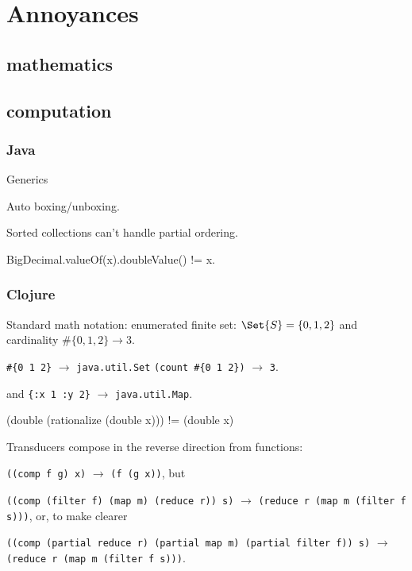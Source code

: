 \chapter{Annoyances}

\section{mathematics}

\section{computation}

\subsection{Java}
\lstset{language=Java}

Generics

Auto boxing/unboxing.

Sorted collections can't handle partial ordering.

BigDecimal.valueOf(x).doubleValue() != x.

\subsection{Clojure}
\lstset{language=Clojure}

Standard math notation: 
enumerated finite set: $\Set{S} = \{0, 1, 2\}$ 
and cardinality $\#\{0, 1, 2\}
\rightarrow 3$.

\lstinline|#{0 1 2}| $\rightarrow$ \lstinline|java.util.Set|
\lstinline|(count #{0 1 2})| $\rightarrow$
\lstinline|3|.

and
\lstinline|{:x 1 :y 2}| $\rightarrow$ \lstinline|java.util.Map|.

(double (rationalize (double x))) != (double x)

Transducers compose in the reverse direction from functions:

\lstinline|((comp f g) x)| $\rightarrow$
\lstinline|(f (g x))|, but

\lstinline|((comp (filter f) (map m) (reduce r)) s)| $\rightarrow$
\lstinline|(reduce r (map m (filter f s)))|, or, to make clearer


\lstinline|((comp (partial reduce r) (partial map m) (partial filter f)) s)| 
$\rightarrow$ \lstinline|(reduce r (map m (filter f s)))|.
